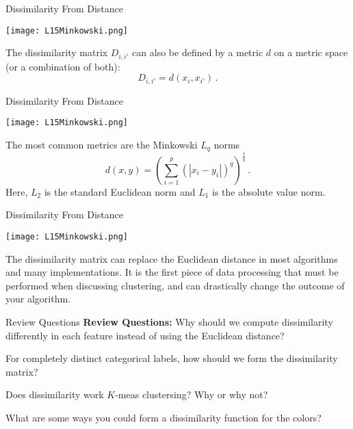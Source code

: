 \documentclass[10pt, table, dvipsnames,xcdraw,handout]{beamer}
\begin{document}
\begin{frame}[fragile]{Dissimilarity From Distance}
  \begin{minipage}[t][0.5\textheight][t]{\textwidth}
	\centering \texttt{[image: L15Minkowski.png]} 
  \end{minipage}
  \vfill
\begin{minipage}[t][0.5\textheight][t]{\textwidth}
The dissimilarity matrix $D_{i,i'}$ can also be defined by a metric $d$ on a metric space (or a combination of both):
$$
D_{i,i'} = d(x_i,x_{i'})\,.
$$
\end{minipage}
\end{frame}


\begin{frame}[fragile]{Dissimilarity From Distance}
  \begin{minipage}[t][0.5\textheight][t]{\textwidth}
	\centering \texttt{[image: L15Minkowski.png]} 
  \end{minipage}
  \vfill
\begin{minipage}[t][0.5\textheight][t]{\textwidth}
The most common metrics are the Minkowski $L_q$ norms
$$
d(x,y) = \left(\sum_{i = 1}^p (|x_i - y_i|)^{q}\right)^{\frac{1}q}\,.
$$
Here, $L_2$ is the standard Euclidean norm and $L_1$ is the absolute value norm. 
\end{minipage}
\end{frame}


\begin{frame}[fragile]{Dissimilarity From Distance}
  \begin{minipage}[t][0.5\textheight][t]{\textwidth}
	\centering \texttt{[image: L15Minkowski.png]} 
  \end{minipage}
  \vfill
\begin{minipage}[t][0.5\textheight][t]{\textwidth}
The dissimilarity matrix can replace the Euclidean distance in most algorithms and many implementations. It is the first piece of data processing that must be performed when discussing clustering, and can drastically change the outcome of your algorithm. 
\end{minipage}
\end{frame}

\begin{frame}[fragile]{Review Questions}
\textbf{Review Questions:}
Why should we compute dissimilarity differently in each feature instead of using the Euclidean distance?

For completely distinct categorical labels, how should we form the dissimilarity matrix?

Does dissimilarity work $K$-meas clustersing? Why or why not?

What are some ways you could form a dissimilarity function for the colors?


\end{frame}
\end{document}
